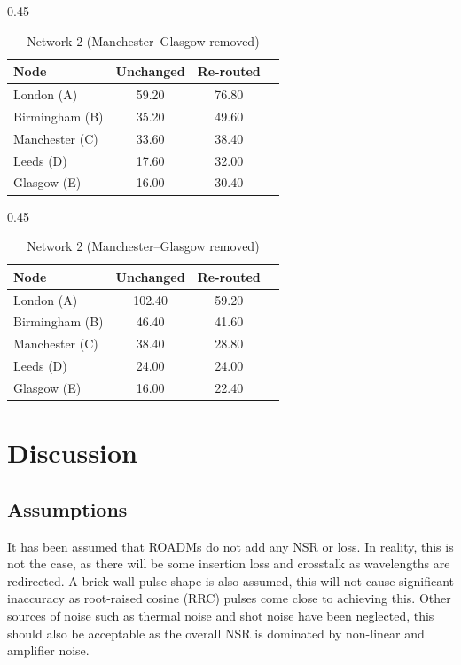 \documentclass[12pt,a4paper]{article}
\begin{document}
\begin{table}[H]
\centering
\caption{Capacity delivered to each node (Tb/s) after worst-case edge removal (PCSF fiber).}
\label{tab:res_node_cap}
\begin{subtable}[t]{0.45\textwidth}
\centering
\caption{Network 1 (Birmingham--Manchester removed)}
\begin{tabular}{lccc}
\toprule
Node & Unchanged & Re-routed \\
\midrule
London (A)     & 59.20 & 76.80 \\
Birmingham (B) & 35.20 & 49.60 \\
Manchester (C) & 33.60 & 38.40 \\
Leeds (D)      & 17.60 & 32.00 \\
Glasgow (E)    & 16.00 & 30.40 \\
\bottomrule
\end{tabular}
\end{subtable}
\hfill
\begin{subtable}[t]{0.45\textwidth}
\centering
\caption{Network 2 (Manchester--Glasgow removed)}
\begin{tabular}{lccc}
\toprule
Node & Unchanged & Re-routed \\
\midrule
London (A)     & 102.40 & 59.20 \\
Birmingham (B) &  46.40 & 41.60 \\
Manchester (C) &  38.40 & 28.80 \\
Leeds (D)      &  24.00 & 24.00 \\
Glasgow (E)    &  16.00 & 22.40 \\
\bottomrule
\end{tabular}
\end{subtable}
\end{table}

\section{Discussion}

\subsection{Assumptions}
It has been assumed that ROADMs do not add any NSR or loss. In reality, this is not the case, as there will be some insertion loss and crosstalk as wavelengths are redirected. A brick-wall pulse shape is also assumed, this will not cause significant inaccuracy as root-raised cosine (RRC) pulses come close to achieving this. Other sources of noise such as thermal noise and shot noise have been neglected, this should also be acceptable as the overall NSR is dominated by non-linear and amplifier noise.
\end{document}
